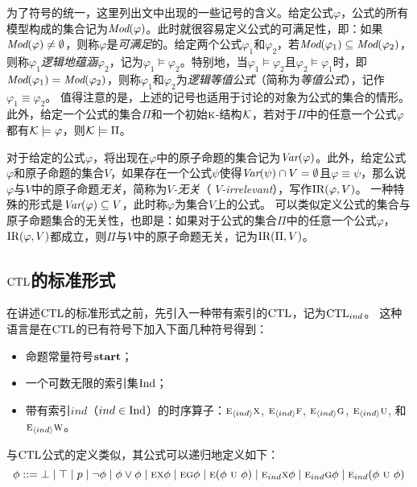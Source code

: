 为了符号的统一，这里列出文中出现的一些记号的含义。给定公式$\varphi$，公式的所有模型构成的集合记为$\textit{Mod}(\varphi)$。此时就很容易定义公式的可满足性，即：如果$\textit{Mod}(\varphi)\not = \emptyset$，则称$\varphi$是\emph{可满足}的。给定两个公式$\varphi_1$和$\varphi_2$，若$\textit{Mod}(\varphi_1)\subseteq \textit{Mod}(\varphi_2)$，则称$\varphi_1$\emph{逻辑地蕴涵}$\varphi_2$，记为$\varphi_1\models \varphi_2$。特别地，当$\varphi_1\models \varphi_2$且$\varphi_2\models \varphi_1$时，即$\textit{Mod}(\varphi_1)= \textit{Mod}(\varphi_2)$，则称$\varphi_1$和$\varphi_2$为\emph{逻辑等值公式}（简称为\emph{等值公式}），记作$\varphi_1 \equiv \varphi_2$。
值得注意的是，上述的记号也适用于讨论的对象为公式的集合的情形。
此外，给定一个公式的集合$\Pi$和一个初始$\textsc{k}$-结构$\cal K$，若对于$\Pi$中的任意一个公式$\varphi$都有${\cal K} \models \varphi$，则${\cal K} \models \Pi$。

对于给定的公式$\varphi$，将出现在$\varphi$中的原子命题的集合记为$\textit{Var}(\varphi)$。此外，给定公式$\varphi$和原子命题的集合$V$，如果存在一个公式$\psi$使得$\textit{Var}(\psi) \cap V = \emptyset$且$\varphi \equiv \psi$，那么说$\varphi$与$V$中的原子命题\emph{无关}，简称为\emph{$V$-无关}（ \emph{$V$-irrelevant}），写作$\textrm{IR}(\varphi,V)$。
一种特殊的形式是$\textit{Var}(\varphi) \subseteq V$，此时称$\varphi$为集合$V$上的公式。
可以类似定义公式的集合与原子命题集合的无关性，也即是：如果对于公式的集合$\Pi$中的任意一个公式$\varphi$，$\textrm{IR}(\varphi,V)$都成立，则$\Pi$与$V$中的原子命题无关，记为$\textrm{IR}(\Pi,V)$。

\subsection{$\textrm{CTL}$的标准形式}

在讲述$\textrm{CTL}$的标准形式之前，先引入一种带有索引的$\textrm{CTL}$，记为$\textrm{CTL}_{ind}$。
这种语言是在$\textrm{CTL}$的已有符号下加入下面几种符号得到：
\begin{itemize}
	\item 命题常量符号$\textbf{start}$；
	\item 一个可数无限的索引集$\textrm{Ind}$；
	\item 带有索引$ind$（$ind \in \textrm{Ind}$）的时序算子：$\textsc{e}_{{\langle{ind}\rangle}} \textsc{x}$, $\textsc{e}_{{\langle{ind}\rangle}} \textsc{f}$, $\textsc{e}_{{\langle{ind}\rangle}} \textsc{g}$, $\textsc{e}_{{\langle{ind}\rangle}} \textsc{u}$, 和 $\textsc{e}_{{\langle{ind}\rangle}} \textsc{w}$。
\end{itemize}
与$\textrm{CTL}$公式的定义类似，其公式可以递归地定义如下：
\begin{equation}\label{def:CTL_ind:formulas}
	\phi ::=  \bot \mid \top \mid p \mid\neg\phi \mid \phi\lor\phi \mid
	\textsc{e} \textsc{x} \phi \mid
	\textsc{e} \textsc{g} \phi \mid
	\textsc{e} (\phi\ \textsc{u}\ \phi)\mid
	\textsc{e}_{ind} \textsc{x} \phi \mid
	\textsc{e}_{ind} \textsc{g} \phi \mid
	\textsc{e}_{ind} (\phi\ \textsc{u}\ \phi)
\end{equation}

